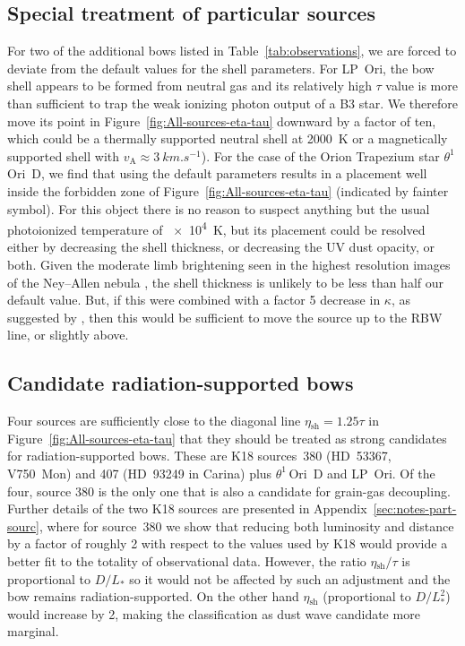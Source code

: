 \documentclass[useAMS, usenatbib, a4paper]{mnras}
\newcommand{\alfven}{\ensuremath{_{\scriptscriptstyle\text{A}}}}
\newcommand{\thD}{\(\theta^1\)\,Ori~D}
\newcommand\shell{\ensuremath{_{\text{sh}}}}
\begin{document}
\subsection{Special treatment of particular sources}
\label{sec:spec-treatm-part}

For two of the additional bows listed in Table~\ref{tab:observations},
we are forced to deviate from the default values for the shell
parameters.  For LP~Ori, the bow shell appears to be formed from
neutral gas \citep{ODell:2001c} and its relatively high \(\tau\) value is
more than sufficient to trap the weak ionizing photon output of a B3
star.  We therefore move its point in
Figure~\ref{fig:All-sources-eta-tau} downward by a factor of ten,
which could be a thermally supported neutral shell at \SI{2000}{K} or
a magnetically supported shell with
\(v\alfven \approx \SI{3}{km.s^{-1}}\)).  For the case of the Orion
Trapezium star \thD{}, we find that using the default parameters
results in a placement well inside the forbidden zone of
Figure~\ref{fig:All-sources-eta-tau} (indicated by fainter symbol).
For this object there is no reason to suspect anything but the usual
photoionized temperature of \SI{e4}{K}, but its placement could be
resolved either by decreasing the shell thickness, or decreasing the
UV dust opacity, or both. Given the moderate limb brightening seen in
the highest resolution images of the Ney--Allen nebula
\citep{Robberto:2005a, Smith:2005a}, the shell thickness is unlikely
to be less than half our default value.  But, if this were combined
with a factor 5 decrease in \(\kappa\), as suggested by
\citet{Salgado:2016a}, then this would be sufficient to move the
source up to the RBW line, or slightly above.


\subsection{Candidate radiation-supported bows}
\label{sec:cand-radi-supp}

Four sources are sufficiently close to the diagonal line
\(\eta\shell = 1.25 \tau\) in Figure~\ref{fig:All-sources-eta-tau}
that they should be treated as strong candidates for
radiation-supported bows. These are K18 sources~380 (HD~53367,
V750~Mon) and 407 (HD~93249 in Carina) plus \thD{} and LP~Ori.  Of the
four, source 380 is the only one that is also a candidate for
grain-gas decoupling.  Further details of the two K18 sources are
presented in Appendix~\ref{sec:notes-part-sourc}, where for source~380
we show that reducing both luminosity and distance by a factor of
roughly 2 with respect to the values used by K18 would provide a
better fit to the totality of observational data.  However, the ratio
\(\eta\shell /\tau\) is proportional to \(D / L_*\) so it would not be
affected by such an adjustment and the bow remains
radiation-supported.  On the other hand \(\eta\shell\) (proportional
to \(D / L_*^2\)) would increase by 2, making the classification as
dust wave candidate more marginal.
\end{document}
